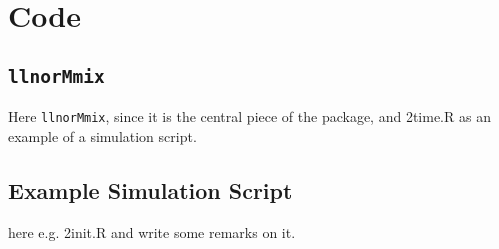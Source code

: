 \chapter{\Rp Code}


\section{{\tt llnorMmix}}

Here {\tt llnorMmix}, since it is the central piece of the package,
and 2time.R as an example of a simulation script.




\clearpage
\section{Example Simulation Script}

\label{App:sims}
here e.g. 2init.R and write some remarks on it.



